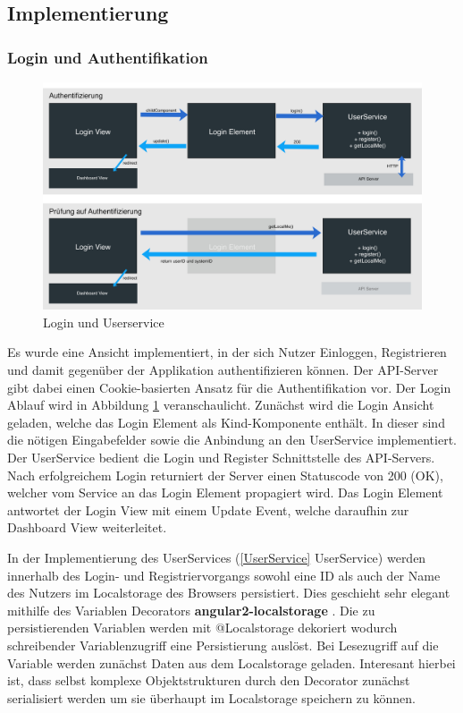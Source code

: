 \subsection{Implementierung}


\subsubsection{Login und Authentifikation}
\label{Login-und-Authentifikation}

\begin{figure}[hptb]
 \centering
 \includegraphics[width=\linewidth]{kapitel4/login.jpg}
 \caption{Login und Userservice}
 \label{kapitel4/login}
\end{figure}
\vspace{0.3cm}

Es wurde eine Ansicht implementiert, in der sich Nutzer Einloggen, Registrieren und damit gegenüber der Applikation authentifizieren können.
Der \ac{API}-Server gibt dabei einen Cookie-basierten Ansatz für die Authentifikation vor. Der Login Ablauf wird in Abbildung \ref{kapitel4/login} veranschaulicht.
Zunächst wird die Login Ansicht geladen, welche das Login Element als Kind-Komponente enthält.
In dieser sind die nötigen Eingabefelder sowie die Anbindung an den UserService implementiert.
Der UserService bedient die Login und Register Schnittstelle des \ac{API}-Servers.
Nach erfolgreichem Login returniert der Server einen Statuscode von 200 (OK), welcher vom Service an das Login Element propagiert wird.
Das Login Element antwortet der Login View mit einem Update Event, welche daraufhin zur Dashboard View weiterleitet.

In der Implementierung des UserServices (\ref{UserService} UserService) werden innerhalb des Login- und Registriervorgangs
sowohl eine ID als auch der Name des Nutzers im Localstorage des Browsers persistiert.
Dies geschieht sehr elegant mithilfe des Variablen Decorators \textbf{angular2-localstorage} \cite{marcj95:online}.
Die zu persistierenden Variablen werden mit @Localstorage dekoriert wodurch schreibender Variablenzugriff eine Persistierung auslöst.
Bei Lesezugriff auf die Variable werden zunächst Daten aus dem Localstorage geladen.
Interesant hierbei ist, dass selbst komplexe Objektstrukturen durch den Decorator zunächst serialisiert werden um sie überhaupt im Localstorage speichern zu können.


